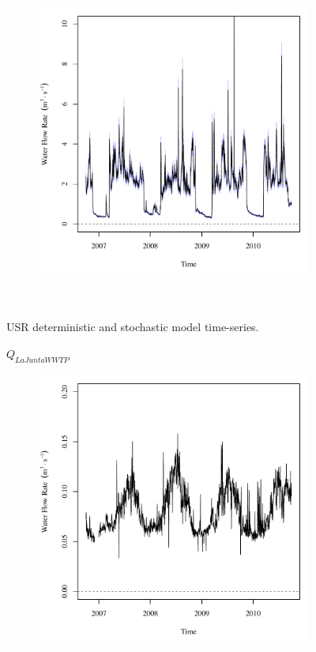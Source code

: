 \begin{linenumbers}
\begin{landscape}
\begin{figure}
\begin{subfigure}{0.7\textwidth}
			\includegraphics[width=\textwidth]{"Figures/Results_USR/Stochastic/Q TIM"}
		\end{subfigure}\\
		\caption{USR deterministic and stochastic model time-series.}
	\end{figure}
\end{landscape}
\subfiguremid
\begin{landscape}
	\begin{figure}
		\centering
		$ Q_{LaJuntaWWTP} $
		\begin{subfigure}{0.7\textwidth}
			\centering
			\includegraphics[width=\textwidth]{"Figures/Results_USR/Deterministic/Q WTP"}

\end{subfigure}
\end{figure}
\end{landscape}
\end{linenumbers}
